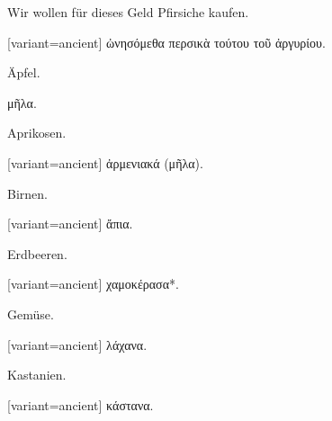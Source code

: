 Wir wollen für dieses Geld Pfirsiche kaufen. 

\switchcolumn

\begin{greek}[variant=ancient]%
ὠνησόμεθα περσικὰ τούτου τοῦ ἀργυρίου.

\end{greek}%
\switchcolumn*\bgroup

\myafterpagetrue{}Äpfel.

\egroup\switchcolumn\bgroup

\textgreek[variant=ancient]{μῆλα.}

\egroup\switchcolumn*\bgroup

Aprikosen.

\egroup\switchcolumn\bgroup

\begin{greek}[variant=ancient]%
ἀρμενιακά (μῆλα).

\end{greek}%
\egroup\switchcolumn*\bgroup

Birnen. 

\egroup\switchcolumn\bgroup

\begin{greek}[variant=ancient]%
ἄπια.

\end{greek}%
\egroup\switchcolumn*\bgroup

Erdbeeren. 

\egroup\switchcolumn\bgroup

\begin{greek}[variant=ancient]%
χαμοκέρασα{*}.

\end{greek}%
\egroup\switchcolumn*\bgroup

Gemüse. 

\egroup\switchcolumn\bgroup

\begin{greek}[variant=ancient]%
λάχανα.

\end{greek}%
\egroup\switchcolumn*\bgroup

Kastanien. 

\egroup\switchcolumn\bgroup

\begin{greek}[variant=ancient]%
κάστανα.

\end{greek}%
\egroup\switchcolumn*\bgroup

